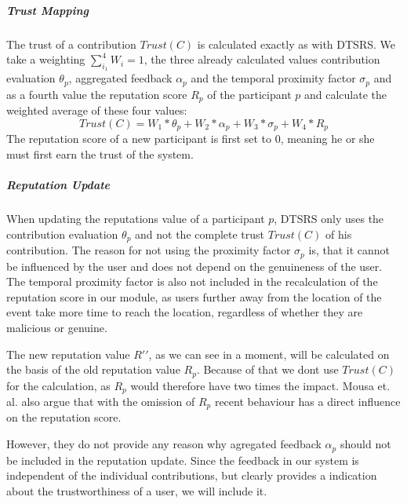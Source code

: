 \subparagraph{Trust Mapping} The trust of a contribution $Trust(C)$ is calculated exactly as with DTSRS. We take a weighting $\sum_{i_1}^{4} W_i = 1$, the three already calculated values contribution evaluation $\theta_p$, aggregated feedback $\alpha_p$ and the temporal proximity factor $\sigma_p$ and as a fourth value the reputation score $R_p$ of the participant $p$ and calculate the weighted average of these four values:
\begin{equation}
  Trust(C) = W_1 * \theta_p +W_2 *  \alpha_p +W_3 *  \sigma_p +W_4 *  R_p
\end{equation}
The reputation score of a new participant is first set to 0, meaning he or she must first earn the trust of the system.

\subparagraph{Reputation Update} When updating the reputations value of a participant $p$, DTSRS only uses the contribution evaluation $\theta_p$ and not the complete trust $Trust(C)$ of his contribution. The reason for not using the proximity factor $\sigma_p$ is, that it cannot be influenced by the user and does not depend on the genuineness of the user. The temporal proximity factor is also not included in the recalculation of the reputation score in our module, as users further away from the location of the event take more time to reach the location, regardless of whether they are malicious or genuine.

The new reputation value $R\prime\prime$, as we can see in a moment, will be calculated on the basis of the old reputation value $R_p$. Because of that we dont use $Trust(C)$ for the calculation, as $R_p$ would therefore have two times the impact. Mousa et. al. also argue that with the omission of $R_p$ recent behaviour has a direct influence on the reputation score.

However, they do not provide any reason why agregated feedback $\alpha_p$ should not be included in the reputation update. Since the feedback in our system is independent of the individual contributions, but clearly provides a indication about the trustworthiness of a user, we will include it.\\

